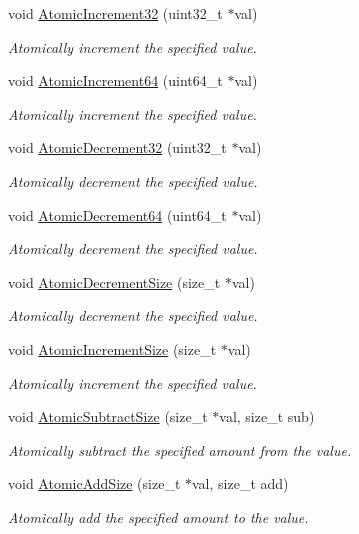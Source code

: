 \begin{DoxyCompactItemize}
void \hyperlink{group__sync__hal_ga6d69fadaf3f1944173ccaf7c2f40aab1}{Atomic\+Increment32} (uint32\+\_\+t $\ast$val)
\begin{DoxyCompactList}\small\item\em Atomically increment the specified value. \end{DoxyCompactList}\item 
void \hyperlink{group__sync__hal_ga87eeca8b8f6c571378496fe74954c76b}{Atomic\+Increment64} (uint64\+\_\+t $\ast$val)
\begin{DoxyCompactList}\small\item\em Atomically increment the specified value. \end{DoxyCompactList}\item 
void \hyperlink{group__sync__hal_ga3607e5dae996cb05b3c11bbddde598d8}{Atomic\+Decrement32} (uint32\+\_\+t $\ast$val)
\begin{DoxyCompactList}\small\item\em Atomically decrement the specified value. \end{DoxyCompactList}\item 
void \hyperlink{group__sync__hal_gab66c6ef44e29babd3f1cdb774cec60dd}{Atomic\+Decrement64} (uint64\+\_\+t $\ast$val)
\begin{DoxyCompactList}\small\item\em Atomically decrement the specified value. \end{DoxyCompactList}\item 
void \hyperlink{group__sync__hal_ga44f4ee602f6d6d0452a08bc0bf65f25c}{Atomic\+Decrement\+Size} (size\+\_\+t $\ast$val)
\begin{DoxyCompactList}\small\item\em Atomically decrement the specified value. \end{DoxyCompactList}\item 
void \hyperlink{group__sync__hal_ga882f1b1bd43e4a645cdee62d03a15e2d}{Atomic\+Increment\+Size} (size\+\_\+t $\ast$val)
\begin{DoxyCompactList}\small\item\em Atomically increment the specified value. \end{DoxyCompactList}\item 
void \hyperlink{group__sync__hal_gab09d35591e9ab3f6a8602498e1ba802c}{Atomic\+Subtract\+Size} (size\+\_\+t $\ast$val, size\+\_\+t sub)
\begin{DoxyCompactList}\small\item\em Atomically subtract the specified amount from the value. \end{DoxyCompactList}\item 
void \hyperlink{group__sync__hal_gadb08d4b0323ea9683ad893deb2894ae6}{Atomic\+Add\+Size} (size\+\_\+t $\ast$val, size\+\_\+t add)
\begin{DoxyCompactList}\small\item\em Atomically add the specified amount to the value. \end{DoxyCompactList}\end{DoxyCompactItemize}


